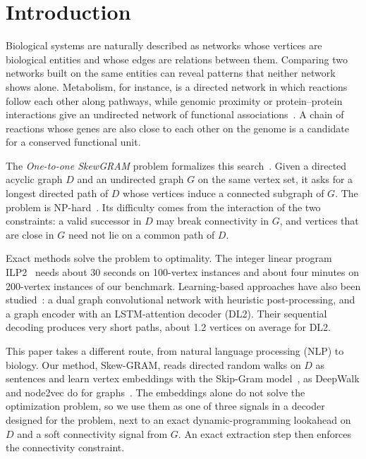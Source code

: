 \documentclass{llncs}
\begin{document}
\section{Introduction}

Biological systems are naturally described as networks whose vertices are biological entities and whose edges are relations between them. Comparing two networks built on the same entities can reveal patterns that neither network shows alone. Metabolism, for instance, is a directed network in which reactions follow each other along pathways, while genomic proximity or protein--protein interactions give an undirected network of functional associations~\cite{sharan2006,zaharia}. A chain of reactions whose genes are also close to each other on the genome is a candidate for a conserved functional unit.

The \emph{One-to-one SkewGRAM} problem formalizes this search~\cite{fertin2012,sidi2022}. Given a directed acyclic graph $D$ and an undirected graph $G$ on the same vertex set, it asks for a longest directed path of $D$ whose vertices induce a connected subgraph of $G$. The problem is NP-hard~\cite{fertin2012,sidi}. Its difficulty comes from the interaction of the two constraints: a valid successor in $D$ may break connectivity in $G$, and vertices that are close in $G$ need not lie on a common path of $D$.

Exact methods solve the problem to optimality. The integer linear program ILP2~\cite{sidi2022,sidi} needs about 30 seconds on 100-vertex instances and about four minutes on 200-vertex instances of our benchmark. Learning-based approaches have also been studied~\cite{sidi_dl}: a dual graph convolutional network with heuristic post-processing, and a graph encoder with an LSTM-attention decoder (DL2). Their sequential decoding produces very short paths, about 1.2 vertices on average for DL2.

This paper takes a different route, from natural language processing (NLP) to biology. Our method, Skew-GRAM, reads directed random walks on $D$ as sentences and learn vertex embeddings with the Skip-Gram model~\cite{mikolov}, as DeepWalk and node2vec do for graphs~\cite{perozzi,grover}. The embeddings alone do not solve the optimization problem, so we use them as one of three signals in a decoder designed for the problem, next to an exact dynamic-programming lookahead on $D$ and a soft connectivity signal from $G$. An exact extraction step then enforces the connectivity constraint.
\end{document}
